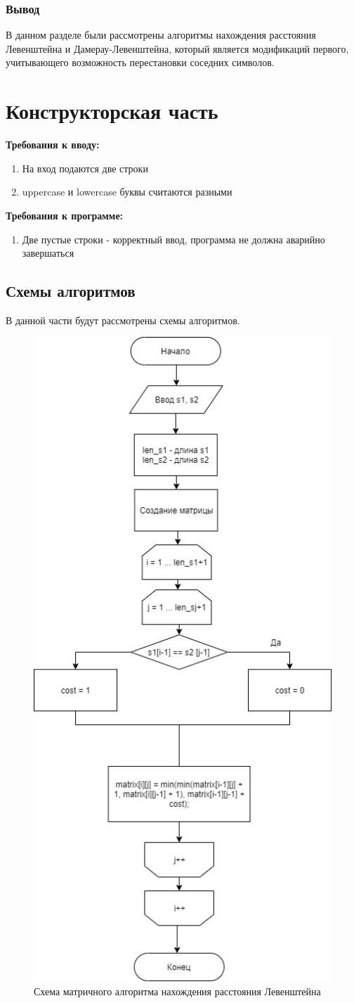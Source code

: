 \documentclass[12pt]{report}
\begin{document}
		\subsection{Вывод}
		В данном разделе были рассмотрены алгоритмы нахождения расстояния Левенштейна и Дамерау-Левенштейна, который является модификаций первого, учитывающего возможность перестановки соседних символов. 




\chapter{Конструкторская часть}
\textbf{Требования к вводу:}
\begin{enumerate}
  	\item На вход подаются две строки
	\item uppercase и lowercase буквы считаются разными
\end{enumerate}
\textbf{Требования к программе:}
\begin{enumerate}
  	\item Две пустые строки - корректный ввод, программа не должна аварийно завершаться
\end{enumerate}
\section{Схемы алгоритмов}
В данной части будут рассмотрены схемы алгоритмов.


\begin{figure}[h]
\centering
\includegraphics[width=0.6\linewidth]{MatrixL.jpg}
\caption{Схема матричного алгоритма нахождения расстояния Левенштейна}
\label{fig:mpr}
\end{figure}
\end{document}
